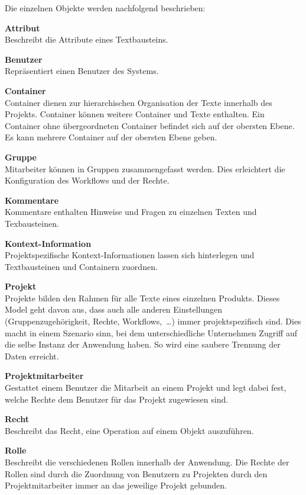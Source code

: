 Die einzelnen Objekte werden nachfolgend beschrieben:

\textsf{\textbf{Attribut}}\\Beschreibt die Attribute eines Textbausteins.

\textsf{\textbf{Benutzer}}\\Repräsentiert einen Benutzer des Systems.

\textsf{\textbf{Container}}\\Container dienen zur hierarchischen Organisation der Texte innerhalb des Projekts. Container können weitere Container und Texte enthalten. Ein Container ohne übergeordneten Container befindet sich auf der obersten Ebene. Es kann mehrere Container auf der obersten Ebene geben.

\textsf{\textbf{Gruppe}}\\Mitarbeiter können in Gruppen zusammengefasst werden. Dies erleichtert die Konfiguration des Workflows und der Rechte.

\textsf{\textbf{Kommentare}}\\Kommentare enthalten Hinweise und Fragen zu einzelnen Texten und Texbausteinen.

\textsf{\textbf{Kontext-Information}}\\Projektspezifische Kontext-Informationen lassen sich hinterlegen und Textbausteinen und Containern zuordnen.

\textsf{\textbf{Projekt}}\\Projekte bilden den Rahmen für alle Texte eines einzelnen Produkts. Dieses Model geht davon aus, dass auch alle anderen Einstellungen (Gruppenzugehörigkeit, Rechte, Workflows,~…) immer projektspezifisch sind. Dies macht in einem Szenario sinn, bei dem unterschiedliche Unternehmen Zugriff auf die selbe Instanz der Anwendung haben. So wird eine saubere Trennung der Daten erreicht.

\textsf{\textbf{Projektmitarbeiter}}\\Gestattet einem Benutzer die Mitarbeit an einem Projekt und legt dabei fest, welche Rechte dem Benutzer für das Projekt zugewiesen sind.

\textsf{\textbf{Recht}}\\Beschreibt das Recht, eine Operation auf einem Objekt auszuführen.

\textsf{\textbf{Rolle}}\\Beschreibt die verschiedenen Rollen innerhalb der Anwendung. Die Rechte der Rollen sind durch die Zuordnung von Benutzern zu Projekten durch den Projektmitarbeiter immer an das jeweilige Projekt gebunden.


